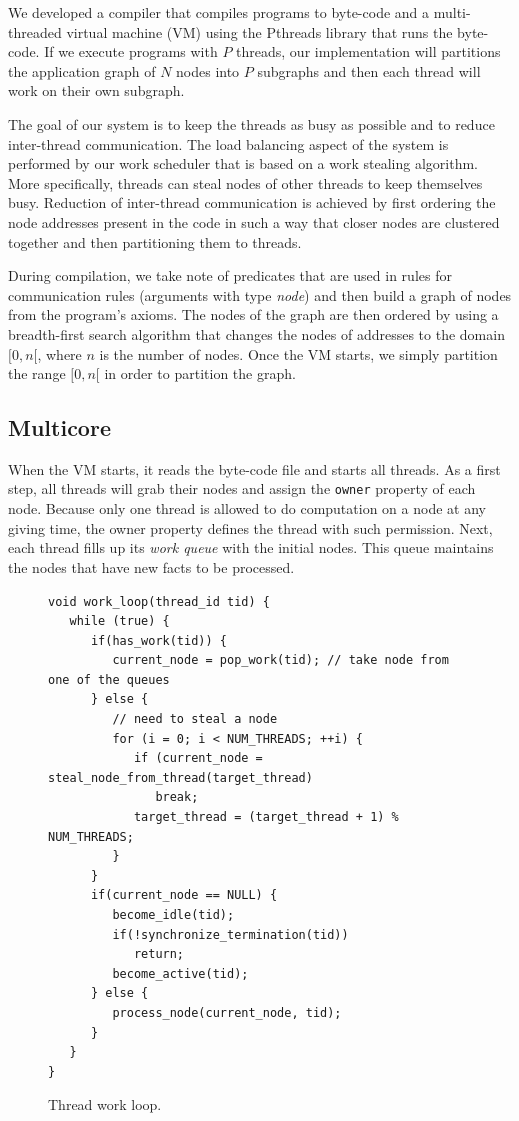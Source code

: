 
We developed a compiler that compiles programs to byte-code and a multi-threaded
virtual machine (VM) using the Pthreads library that runs the byte-code.
If we execute programs with $P$ threads, our implementation will partitions the application
graph of $N$ nodes into $P$ subgraphs and then each thread will work on their own subgraph.

The goal of our system is to keep the threads as busy as possible and to reduce inter-thread communication.
The load balancing aspect of the system is performed by our work scheduler that is based on a work
stealing algorithm. More specifically, threads can steal nodes of other threads to keep themselves busy.
Reduction of inter-thread communication is achieved by first ordering the node addresses present
in the code in such a way that closer nodes are clustered together and then partitioning them
to threads.

During compilation, we take note of predicates that are used in rules for
communication rules (arguments with type \emph{node}) and then build a graph of nodes from
the program's axioms. The nodes of the graph are then ordered by using a breadth-first search
algorithm that changes the nodes of addresses to the domain $[0, n[$, where $n$ is the number of
nodes. Once the VM starts, we simply partition the range
$[0, n[$ in order to partition the graph.

\subsection{Multicore}

When the VM starts, it reads the byte-code file and starts all threads.
As a first step, all threads will grab their nodes and assign the \texttt{owner} property of each node.
Because only one thread is allowed to do computation on a node at any giving time, the owner property
defines the thread with such permission.
Next, each thread fills up its \emph{work queue} with the initial nodes. This queue
maintains the nodes that have new facts to be processed.

\begin{figure}[h!]
\footnotesize\begin{Verbatim}
void work_loop(thread_id tid) {
   while (true) {
      if(has_work(tid)) {
         current_node = pop_work(tid); // take node from one of the queues
      } else {
         // need to steal a node
         for (i = 0; i < NUM_THREADS; ++i) {
            if (current_node = steal_node_from_thread(target_thread)
               break;
            target_thread = (target_thread + 1) % NUM_THREADS;
         }
      }
      if(current_node == NULL) {
         become_idle(tid);
         if(!synchronize_termination(tid))
            return;
         become_active(tid);
      } else {
         process_node(current_node, tid);
      }
   }
}
\end{Verbatim}
  \caption{Thread work loop.}
  \label{code:work_loop}
\end{figure}

